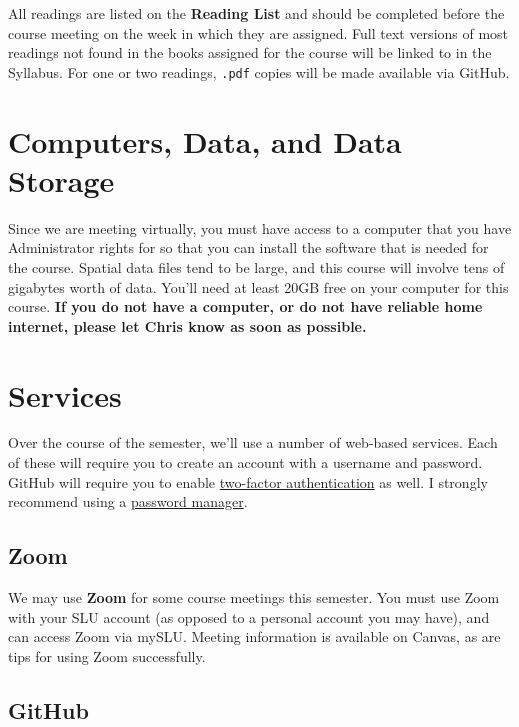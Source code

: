 \documentclass[
]{book}
\begin{document}
All readings are listed on the \textbf{Reading List} and should be completed before the course meeting on the week in which they are assigned. Full text versions of most readings not found in the books assigned for the course will be linked to in the Syllabus. For one or two readings, \texttt{.pdf} copies will be made available via GitHub.

\hypertarget{computers-data-and-data-storage}{%
\section{Computers, Data, and Data Storage}\label{computers-data-and-data-storage}}

Since we are meeting virtually, you must have access to a computer that you have Administrator rights for so that you can install the software that is needed for the course. Spatial data files tend to be large, and this course will involve tens of gigabytes worth of data. You'll need at least 20GB free on your computer for this course. \textbf{If you do not have a computer, or do not have reliable home internet, please let Chris know as soon as possible.}

\hypertarget{services}{%
\section{Services}\label{services}}

Over the course of the semester, we'll use a number of web-based services. Each of these will require you to create an account with a username and password. GitHub will require you to enable \href{https://en.wikipedia.org/wiki/Multi-factor_authentication}{two-factor authentication} as well. I strongly recommend using a \href{https://lifehacker.com/5529133/five-best-password-managers}{password manager}.

\hypertarget{zoom}{%
\subsection{Zoom}\label{zoom}}

We may use \textbf{Zoom} for some course meetings this semester. You must use Zoom with your SLU account (as opposed to a personal account you may have), and can access Zoom via mySLU. Meeting information is available on Canvas, as are tips for using Zoom successfully.

\hypertarget{github}{%
\subsection{GitHub}\label{github}}
\end{document}

